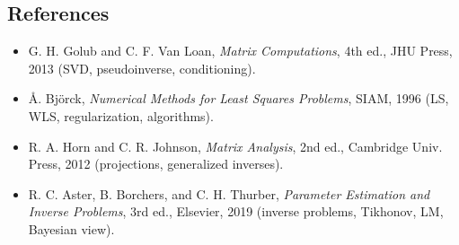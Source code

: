 \documentclass[11pt,a4paper]{article}
\begin{document}
\subsection*{References}
\begin{itemize}
  \item G. H. Golub and C. F. Van Loan, \emph{Matrix Computations}, 4th ed., JHU Press, 2013 (SVD, pseudoinverse, conditioning).
  \item Å. Björck, \emph{Numerical Methods for Least Squares Problems}, SIAM, 1996 (LS, WLS, regularization, algorithms).
  \item R. A. Horn and C. R. Johnson, \emph{Matrix Analysis}, 2nd ed., Cambridge Univ. Press, 2012 (projections, generalized inverses).
  \item R. C. Aster, B. Borchers, and C. H. Thurber, \emph{Parameter Estimation and Inverse Problems}, 3rd ed., Elsevier, 2019 (inverse problems, Tikhonov, LM, Bayesian view).
\end{itemize}
\end{document}
